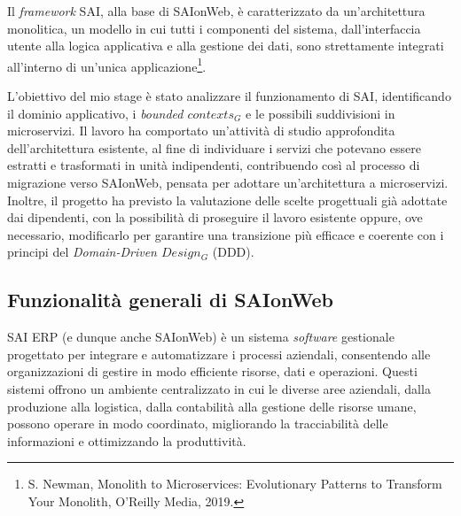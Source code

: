     \vspace{0.2 em}
    \noindent Il \textit{framework} SAI, alla base di SAIonWeb, è caratterizzato da un'architettura monolitica, un modello in cui tutti i componenti del sistema, dall’interfaccia utente alla logica applicativa e alla gestione dei dati, sono strettamente integrati all’interno di un'unica applicazione\footnote{S. Newman, Monolith to Microservices: Evolutionary Patterns to Transform Your Monolith, O'Reilly Media, 2019.}.  

    \vspace{0.2 em}
    \noindent L'obiettivo del mio stage è stato analizzare il funzionamento di SAI, identificando il dominio applicativo, i \textit{bounded $contexts_G$} e le possibili suddivisioni in microservizi. Il lavoro ha comportato un'attività di studio approfondita dell'architettura esistente, al fine di individuare i servizi che potevano essere estratti e trasformati in unità indipendenti, contribuendo così al processo di migrazione verso SAIonWeb, pensata per adottare un'architettura a microservizi. Inoltre, il progetto ha previsto la valutazione delle scelte progettuali già adottate dai dipendenti, con la possibilità di proseguire il lavoro esistente oppure, ove necessario, modificarlo per garantire una transizione più efficace e coerente con i principi del \textit{Domain-Driven $Design_G$} (DDD). 
    
        \subsection{Funzionalità generali di SAIonWeb}
        SAI ERP (e dunque anche SAIonWeb) è un sistema \textit{software} gestionale progettato per integrare e automatizzare i processi aziendali, consentendo alle organizzazioni di gestire in modo efficiente risorse, dati e operazioni. Questi sistemi offrono un ambiente centralizzato in cui le diverse aree aziendali, dalla produzione alla logistica, dalla contabilità alla gestione delle risorse umane, possono operare in modo coordinato, migliorando la tracciabilità delle informazioni e ottimizzando la produttività.  

